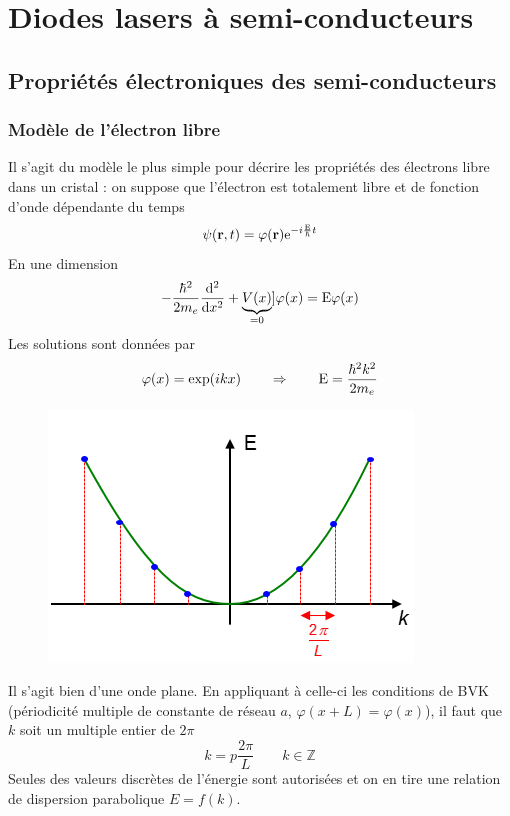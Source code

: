 \chapter{Diodes lasers à semi-conducteurs}
\section{Propriétés électroniques des semi-conducteurs}
	\subsection{Modèle de l'électron libre}
	Il s'agit du modèle le plus simple pour décrire les propriétés des électrons libre dans 
	un cristal : on suppose que l'électron est totalement libre et de fonction d'onde dépendante
	du temps
	\begin{equation}
	\psi ({\bf{r}},t) = \varphi ({\bf{r}}){{\rm{e}}^{ - i\frac{{\rm{E}}}{\hbar }t}}
	\end{equation}
	En une dimension
	\begin{equation}
	- \frac{{{\hbar ^2}}}{{2{m_e}}}\frac{{{{\rm{d}}^2}}}{{{\rm{d}}{x^2}}} + \underbrace{V(x)}_{=0}]
	\varphi (x) = {\rm{E}}	\varphi (x)
	\end{equation}
	Les solutions sont données par
	\begin{equation}
	\varphi (x) = \exp (ikx)\qquad\Rightarrow\qquad {\rm{E}} = \frac{{{\hbar ^2}{k^2}}}{{2{m_e}}}
	\end{equation}
	\begin{figure}
	\vspace{-5mm}
	\includegraphics[scale=0.6]{ch5/image1}
	\end{figure}

	Il s'agit bien d'une onde plane. En appliquant à celle-ci les conditions de BVK (périodicité 
	multiple de constante de réseau $a$, $\varphi(x+L) = \varphi(x)$), il faut que $k$ soit un 
	multiple entier de $2\pi$
	\begin{equation}
	k = p\frac{2\pi}{L}\qquad k\in\mathbb{Z}
	\end{equation}
	Seules des valeurs discrètes de l'énergie sont autorisées et on en tire une relation de 
	dispersion parabolique $E=f(k)$.\\
	
